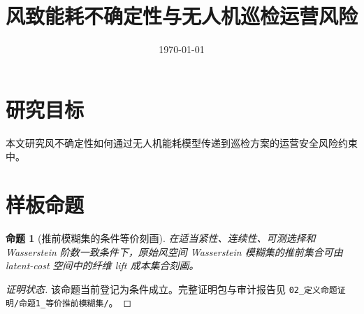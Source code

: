 \documentclass[UTF8]{ctexart}
\title{风致能耗不确定性与无人机巡检运营风险}
\author{}
\date{\today}
\newtheorem{proposition}{命题}
\begin{document}
\maketitle

\section{研究目标}

本文研究风不确定性如何通过无人机能耗模型传递到巡检方案的运营安全风险约束中。

\section{样板命题}

\begin{proposition}[推前模糊集的条件等价刻画]
在适当紧性、连续性、可测选择和 Wasserstein 阶数一致条件下，原始风空间 Wasserstein 模糊集的推前集合可由 latent-cost 空间中的纤维 lift 成本集合刻画。
\end{proposition}

\begin{proof}[证明状态]
该命题当前登记为条件成立。完整证明包与审计报告见
\texttt{02\_定义命题证明/命题1\_等价推前模糊集/}。
\end{proof}
\end{document}
